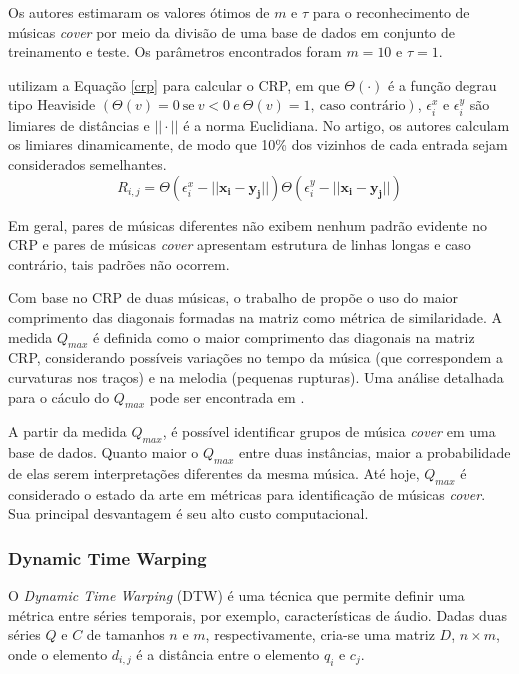 Os autores estimaram os valores ótimos de \({m}\) e \({\tau}\) para o reconhecimento de músicas \textit{cover} por meio da divisão de uma base de dados em conjunto de treinamento e teste. Os parâmetros encontrados foram \({m = 10}\) e \({\tau = 1}\).

 utilizam a Equação \ref{crp} para calcular o CRP, em que \({\Theta(\cdot)}\) é a função degrau tipo Heaviside \({(\Theta(v) = 0 \ \textrm{se} \ v < 0 \  e \  \Theta(v) = 1, \ \textrm{caso contrário})}\), \({\epsilon_{i}^{x}}\) e \({\epsilon_{i}^{y}}\) são limiares de distâncias e \({|| \cdot ||}\) é a norma Euclidiana. No artigo, os autores calculam os limiares dinamicamente, de modo que 10\% dos vizinhos de cada entrada sejam considerados semelhantes.
\begin{equation} \label{crp}
    R_{i,j} = \Theta(\epsilon_{i}^{x} - ||\mathbf{x_{i} - y_{j}}||)\Theta(\epsilon_{i}^{y} - ||\mathbf{x_{i} - y_{j}}||)
\end{equation}

Em geral, pares de músicas diferentes não exibem nenhum padrão evidente no CRP e pares de músicas \textit{cover} apresentam estrutura de linhas longas e caso contrário, tais padrões não ocorrem.

Com base no CRP de duas músicas, o trabalho de  propõe o uso do maior comprimento das diagonais formadas na matriz como métrica de similaridade. A medida \({Q_{max}}\) é definida como o maior comprimento das diagonais na matriz CRP, considerando possíveis variações no tempo da música (que correspondem a curvaturas nos traços) e na melodia (pequenas rupturas). Uma análise detalhada para o cáculo do \({Q_{max}}\) pode ser encontrada em \cite{serra2009}.

A partir da medida \({Q_{max}}\), é possível identificar grupos de música \textit{cover} em uma base de dados. Quanto maior o \({Q_{max}}\) entre duas instâncias, maior a probabilidade de elas serem interpretações diferentes da mesma música. Até hoje, \({Q_{max}}\) é considerado o estado da arte em métricas para identificação de músicas \textit{cover}. Sua principal desvantagem é seu alto custo computacional.

\subsubsection{Dynamic Time Warping} \label{dtw}

O \textit{Dynamic Time Warping} (DTW) \cite{keogh2004} é uma técnica que permite definir uma métrica entre séries temporais, por exemplo, características de áudio. Dadas duas séries \({Q}\) e \({C}\) de tamanhos \({n}\) e \({m}\), respectivamente, cria-se uma matriz \({D}\), \({n\times m}\), onde o elemento \({d_{i,j}}\) é a distância entre o elemento \({q_{i}}\) e \({c_{j}}\).

